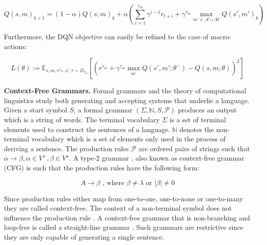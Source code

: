 \documentclass[colorinlistoftodos]{article}
\theoremstyle{definition}
\begin{document}
$$Q(s, m)_{k+1} = (1-\alpha) Q(s, m)_k + \alpha \left(\sum_{i=1}^{\tau_m} \gamma^{i-1} r_{t+i} + \gamma^{\tau_m} \max_{m' \in \mathcal{A} \cup \mathcal{M}} Q(s', m')_k \right)$$  

Furthermore, the DQN objective can easily be refined to the case of macro-actions:

$$L(\theta) := \mathbb{E}_{s,m,r^{\tau_m},s', \tau \sim D_{\tau_m}} [(r^{\tau_m} + \gamma^{\tau_m} \max_{m'} Q(s',m';\theta^-) - Q(s,m; \theta))^2] $$


\textbf{Context-Free Grammars.} Formal grammars and the theory of computational linguistics study both generating and accepting systems that underlie a language. Given a start symbol $S$, a formal grammar $(\Sigma, \mathbb{N}, S, \mathcal{P})$ produces an output which is a string of words. The terminal vocabulary $\Sigma$ is a set of terminal elements used to construct the sentences of a language. $\mathbb{N}$ denotes the non-terminal vocabulary which is a set of elements only used in the process of deriving a sentence.
The production rules $\mathcal{P}$ are ordered pairs of strings such that $\alpha \to \beta, \alpha \in V^+, \beta \in V^\star$.
A type-2 grammar \citep{Chomsky_1959a, Chomsky_1959b}, also known as context-free grammar (CFG) is such that the production rules have the following form: 
 
 \vspace{-0.25cm}
 $$A \to \beta \text{  , where   } \beta \neq \lambda \text{   or  } |\beta| \neq 0$$
 
 Since production rules either map from one-to-one, one-to-none or one-to-many they are called context-free. The context of a non-terminal symbol does not influence the production rule \citep{Pastra_2012}.
A context-free grammar that is non-branching and loop-free is called a straight-line grammar \citep{Siyari_2016}. Such grammars are restrictive since they are only capable of generating a single sentence.
\end{document}

